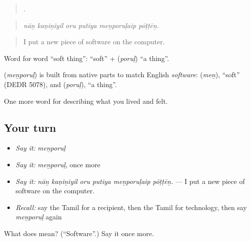 \begin{quote}
     .
\end{quote}

\begin{quote}
\emph{nāṉ kaṇiṉiyil oru putiya meṉporuḷaip pōṭṭēṉ.}
\end{quote}

\begin{quote}
I put a new piece of software on the computer.
\end{quote}

Word for word \textquotedblleft{}soft thing\textquotedblright{}:  \textquotedblleft{}soft\textquotedblright{} +  (\emph{poruḷ}) \textquotedblleft{}a thing\textquotedblright{}.

\begin{cousinweb}
\textbf{} (\emph{meṉporuḷ}) is built from native parts to match English \emph{software}:  (\emph{meṉ}), \textquotedblleft{}soft\textquotedblright{} (DEDR 5078), and  (\emph{poruḷ}), \textquotedblleft{}a thing\textquotedblright{}.
\end{cousinweb}

\begin{grammarlens}[title={What you've built}]
One more word for describing what you lived and felt.
\end{grammarlens}

\subsection*{Your turn}
\begin{itemize}
\raggedright
  \item \emph{Say it:} \emph{meṉporuḷ}
  \item \emph{Say it:} \emph{meṉporuḷ}, once more
  \item \emph{Say it:} \emph{nāṉ kaṇiṉiyil oru putiya meṉporuḷaip pōṭṭēṉ.} — I put a new piece of software on the computer.
  \item \emph{Recall:} say the Tamil for a recipient, then the Tamil for technology, then say \emph{meṉporuḷ} again
\end{itemize}

\begin{tcolorbox}[breakable,colback=teal!4,colframe=teal!35!black,title={Before you move on}]
What does  mean? (\textquotedblleft{}Software\textquotedblright{}.) Say it once more.
\end{tcolorbox}
